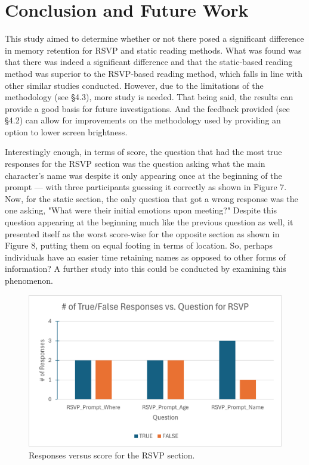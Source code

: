\documentclass[manuscript,screen]{acmart}
\begin{document}
\section{Conclusion and Future Work}
This study aimed to determine whether or not there posed a significant difference in memory retention for RSVP and static reading methods. What was found was that there was indeed a significant difference and that the static-based reading method was superior to the RSVP-based reading method, which falls in line with other similar studies conducted. However, due to the limitations of the methodology (see \S4.3), more study is needed. That being said, the results can provide a good basis for future investigations. And the feedback provided (see \S4.2) can allow for improvements on the methodology used by providing an option to lower screen brightness.

Interestingly enough, in terms of score, the question that had the most true responses for the RSVP section was the question asking what the main character's name was despite it only appearing once at the beginning of the prompt --- with three participants guessing it correctly as shown in Figure 7. Now, for the static section, the only question that got a wrong response was the one asking, "What were their initial emotions upon meeting?" Despite this question appearing at the beginning much like the previous question as well, it presented itself as the worst score-wise for the opposite section as shown in Figure 8, putting them on equal footing in terms of location. So, perhaps individuals have an easier time retaining names as opposed to other forms of information? A further study into this could be conducted by examining this phenomenon.

\begin{figure}[htbp]
  \centering
  \includegraphics[scale=0.75]{Responses vs Question for RSVP.png}
  \caption{Responses versus score for the RSVP section.}
\end{figure}
\end{document}
